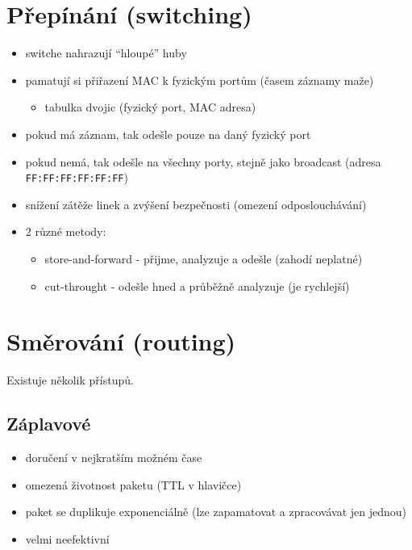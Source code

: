 \documentclass{szzclass}
\providecommand{\tightlist}{%
  \setlength{\itemsep}{0pt}\setlength{\parskip}{0pt}}
\begin{document}
\hypertarget{pux159epuxednuxe1nuxed-switching}{%
\section{Přepínání
(switching)}\label{pux159epuxednuxe1nuxed-switching}}

\begin{itemize}
\tightlist
\item
  switche nahrazují ``hloupé'' huby
\item
  pamatují si přiřazení MAC k fyzickým portům (časem záznamy maže)

  \begin{itemize}
  \tightlist
  \item
    tabulka dvojic (fyzický port, MAC adresa)
  \end{itemize}
\item
  pokud má záznam, tak odešle pouze na daný fyzický port
\item
  pokud nemá, tak odešle na všechny porty, stejně jako broadcast (adresa
  \texttt{FF:FF:FF:FF:FF:FF})
\item
  snížení zátěže linek a zvýšení bezpečnosti (omezení odposlouchávání)
\item
  2 různé metody:

  \begin{itemize}
  \tightlist
  \item
    store-and-forward - přijme, analyzuje a odešle (zahodí neplatné)
  \item
    cut-throught - odešle hned a průběžně analyzuje (je rychlejší)
  \end{itemize}
\end{itemize}

\hypertarget{smux11brovuxe1nuxed-routing}{%
\section{Směrování (routing)}\label{smux11brovuxe1nuxed-routing}}

Existuje několik přístupů.

\hypertarget{zuxe1plavovuxe9}{%
\subsection{Záplavové}\label{zuxe1plavovuxe9}}

\begin{itemize}
\tightlist
\item
  doručení v nejkratším možném čase
\item
  omezená životnost paketu (TTL v hlavičce)
\item
  paket se duplikuje exponenciálně (lze zapamatovat a zpracovávat jen
  jednou)
\item
  velmi neefektivní
\end{itemize}
\end{document}
